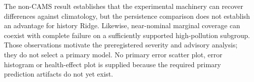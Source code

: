 The non-CAMS result establishes that the experimental machinery can recover
differences against climatology, but the persistence comparison does not
establish an advantage for history Ridge. Likewise, near-nominal marginal
coverage can coexist with complete failure on a sufficiently supported
high-pollution subgroup. Those observations motivate the preregistered
severity and advisory analysis; they do not select a primary model. No
primary error scatter plot, error histogram or health-effect plot is supplied
because the required primary prediction artifacts do not yet exist.
